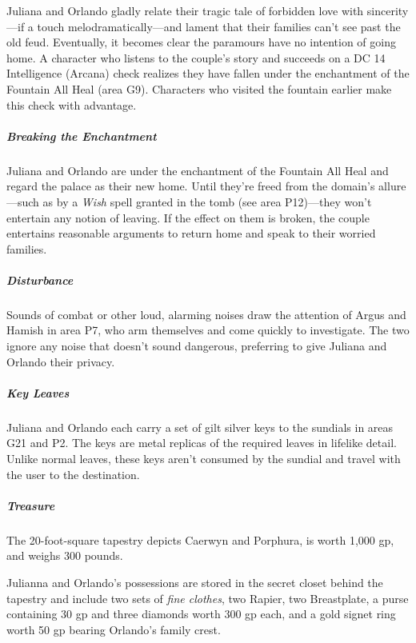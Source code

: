 \documentclass[10pt,a4paper,twoside,bg=print,twocolumn,openany,nodeprecatedcode]{dndbook}
\begin{document}
Juliana and Orlando gladly relate their tragic tale of forbidden love with sincerity—if a touch melodramatically—and lament that their families can't see past the old feud. Eventually, it becomes clear the paramours have no intention of going home. A character who listens to the couple's story and succeeds on a DC 14 Intelligence (Arcana) check realizes they have fallen under the enchantment of the Fountain All Heal (area G9). Characters who visited the fountain earlier make this check with advantage.

\subparagraph{Breaking the Enchantment}
Juliana and Orlando are under the enchantment of the Fountain All Heal and regard the palace as their new home. Until they're freed from the domain's allure—such as by a \textit{Wish} spell granted in the tomb (see area P12)—they won't entertain any notion of leaving. If the effect on them is broken, the couple entertains reasonable arguments to return home and speak to their worried families.

\subparagraph{Disturbance}
Sounds of combat or other loud, alarming noises draw the attention of Argus and Hamish in area P7, who arm themselves and come quickly to investigate. The two ignore any noise that doesn't sound dangerous, preferring to give Juliana and Orlando their privacy.

\subparagraph{Key Leaves}
Juliana and Orlando each carry a set of gilt silver keys to the sundials in areas G21 and P2. The keys are metal replicas of the required leaves in lifelike detail. Unlike normal leaves, these keys aren't consumed by the sundial and travel with the user to the destination.

\subparagraph{Treasure}
The 20-foot-square tapestry depicts Caerwyn and Porphura, is worth 1,000 gp, and weighs 300 pounds.

Julianna and Orlando's possessions are stored in the secret closet behind the tapestry and include two sets of \textit{fine clothes}, two Rapier, two Breastplate, a purse containing 30 gp and three diamonds worth 300 gp each, and a gold signet ring worth 50 gp bearing Orlando's family crest.
\end{document}
